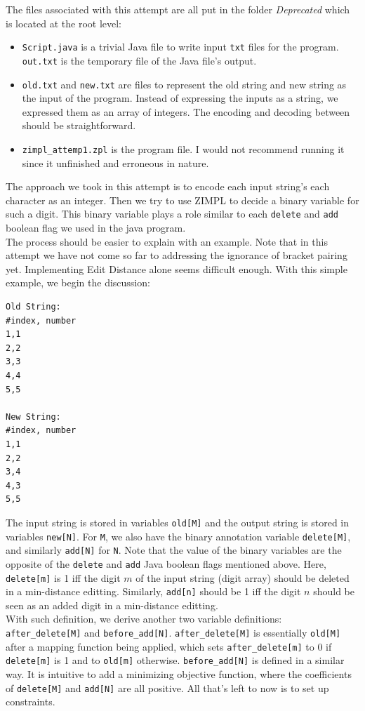\documentclass{article}
\begin{document}
The files associated with this attempt are all put in the folder \textit{Deprecated} which is located at the root level:
\begin{itemize}
  \item \texttt{Script.java} is a trivial Java file to write input \texttt{txt} files for the program. \texttt{out.txt} is the temporary file of the Java file's output.
  \item \texttt{old.txt} and \texttt{new.txt} are files to represent the old string and new string as the input of the program. Instead of expressing the inputs as a string, we expressed them as an array of integers. The encoding and decoding between should be straightforward.
  \item \texttt{zimpl\_attemp1.zpl} is the program file. I would not recommend running it since it unfinished and erroneous in nature. 
\end{itemize}

The approach we took in this attempt is to encode each input string's each character as an integer. Then we try to use ZIMPL to decide a binary variable for such a digit. This binary variable plays a role similar to each \texttt{delete} and \texttt{add} boolean flag we used in the java program. \\

The process should be easier to explain with an example. Note that in this attempt we have not come so far to addressing the ignorance of bracket pairing yet. Implementing Edit Distance alone seems difficult enough. With this simple example, we begin the discussion:
\begin{lstlisting}
Old String:
#index, number
1,1
2,2
3,3
4,4
5,5

New String:
#index, number
1,1
2,2
3,4
4,3
5,5
\end{lstlisting}
The input string is stored in variables \texttt{old[M]} and the output string is stored in variables \texttt{new[N]}. For \texttt{M}, we also have the binary annotation variable \texttt{delete[M]}, and similarly \texttt{add[N]} for \texttt{N}. Note that the value of the binary variables are the opposite of the \texttt{delete} and \texttt{add} Java boolean flags mentioned above. Here, \texttt{delete[m]} is 1 iff the digit $m$ of the input string (digit array) should be deleted in a min-distance editting. Similarly, \texttt{add[n]} should be 1 iff the digit $n$ should be seen as an added digit in a min-distance editting. \\

With such definition, we derive another two variable definitions: \texttt{after\_delete[M]} and \texttt{before\_add[N]}.  \texttt{after\_delete[M]} is essentially \texttt{old[M]} after a mapping function being applied, which sets \texttt{after\_delete[m]} to 0 if \texttt{delete[m]} is 1 and to \texttt{old[m]} otherwise. \texttt{before\_add[N]} is defined in a similar way. It is intuitive to add a minimizing objective function, where the coefficients of \texttt{delete[M]} and \texttt{add[N]} are all positive. All that's left to now is to set up constraints. \\
\end{document}
